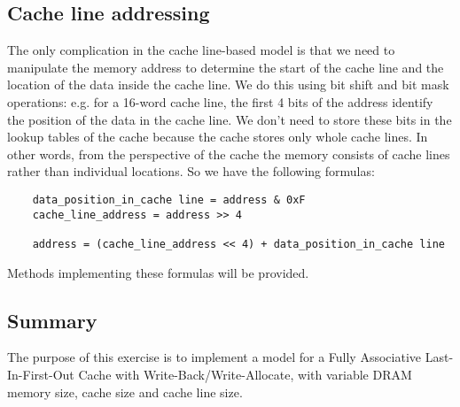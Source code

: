 \documentclass[11pt]{article}
\begin{document}
 \subsection{Cache line addressing}
 
The only complication in the cache line-based model is that we need to manipulate the memory address to determine the start of the cache line and the location of the data inside the cache line. We do this using bit shift and bit mask operations: e.g. for a 16-word cache line, the first 4 bits of the address identify the position of the data in the cache line. We don't need to store these bits in the lookup tables of the cache because the cache stores only whole cache lines. In other words, from the perspective of the cache the memory consists of cache lines rather than individual locations. So we have the following formulas:

\begin{verbatim}
    data_position_in_cache line = address & 0xF
    cache_line_address = address >> 4
    
    address = (cache_line_address << 4) + data_position_in_cache line
\end{verbatim} 

Methods implementing these formulas will be provided.

 \subsection{Summary}
 
The purpose of this exercise is to implement a model for a Fully Associative Last-In-First-Out Cache with Write-Back/Write-Allocate, with variable DRAM memory size, cache size and cache line size.

%
%
%
%
%
%
\end{document}
